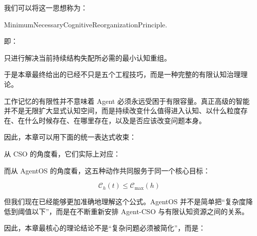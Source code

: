 我们可以将这一思想称为：

\begin{statementbox}
MinimumNecessaryCognitiveReorganizationPrinciple.
\end{statementbox}

即：

\begin{statementbox}
只进行解决当前持续结构失配所必需的最小认知重组。
\end{statementbox}

于是本章最终给出的已经不只是五个工程技巧，而是一种完整的有限认知治理理论。

工作记忆的有限性并不意味着 Agent 必须永远受困于有限容量。真正高级的智能并不是无限扩大显式认知空间，而是持续改变什么值得进入认知、以什么粒度存在、在什么时候存在、在哪里存在，以及是否应该改变问题本身。

因此，本章可以用下面的统一表达式收束：

\begin{statementbox}
\centering
{}
\end{statementbox}

从 CSO 的角度看，它们实际上对应：

\begin{statementbox}
\centering
{}
\end{statementbox}

而从 AgentOS 的角度看，这五种动作共同服务于同一个核心目标：

\[
\boxed{
\mathcal C_h(t)
\leq
\mathcal C_{\max}(h)
}
\]

但我们现在已经能够更加准确地理解这个公式。AgentOS 并不是简单把“复杂度降低到阈值以下”，而是在不断重新安排 Agent-CSO 与有限认知资源之间的关系。

因此，本章最核心的理论结论不是“复杂问题必须被简化”，而是：

